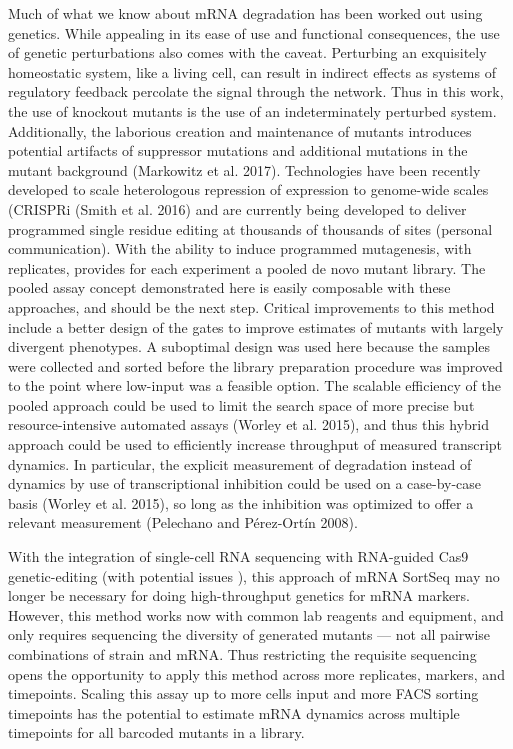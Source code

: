 Much of what we know about mRNA
degradation has been worked out using genetics. While appealing in its
ease of use and functional consequences, the use of genetic
perturbations also comes with the caveat. Perturbing an exquisitely
homeostatic system, like a living cell, can result in indirect effects
as systems of regulatory feedback percolate the signal through the
network. Thus in this work, the use of knockout mutants is the use of
an indeterminately perturbed system. Additionally, the laborious
creation and maintenance of mutants introduces potential artifacts of
suppressor mutations and additional mutations in the mutant background
(Markowitz et al. 2017). Technologies have been recently developed to
scale heterologous repression of expression to genome-wide scales
(CRISPRi (Smith et al. 2016) and are currently being developed to
deliver programmed single residue editing at thousands of thousands of
sites (personal communication). With the ability to induce programmed
mutagenesis, with  replicates, provides for each experiment a pooled
de novo mutant library. The pooled assay concept demonstrated here is
easily composable with these approaches, and should be the next step.
Critical improvements to this method include a better design of the
gates to improve estimates of mutants with largely divergent
phenotypes. A suboptimal design was used here because the samples were
collected and sorted before the library preparation procedure was
improved to the point where low-input was a feasible option.  The
scalable efficiency of the pooled approach could be used to limit the
search space of more precise but resource-intensive automated assays
(Worley et al. 2015), and thus this hybrid approach could be used to
efficiently increase throughput of measured transcript dynamics. In
particular, the explicit measurement of degradation instead of
dynamics by use of transcriptional inhibition could be used on a
case-by-case basis (Worley et al. 2015), so long as the inhibition was
optimized to offer a relevant measurement (Pelechano and Pérez-Ortín
2008).

With the integration of single-cell RNA sequencing with 
RNA-guided Cas9 genetic-editing
\parencite{}
(with potential issues \parencite{hill2018design}),
this approach of mRNA SortSeq may no longer be necessary for doing 
high-throughput genetics for mRNA markers. 
However, this method works now with common lab reagents and equipment, 
and only requires sequencing the diversity of generated mutants ---
not all pairwise combinations of strain and mRNA.
Thus restricting the requisite sequencing opens the opportunity to
apply this method across more replicates, markers, and timepoints.
Scaling this assay up to more cells input and more FACS sorting
timepoints has the potential to estimate mRNA dynamics across multiple
timepoints for all barcoded mutants in a library.

